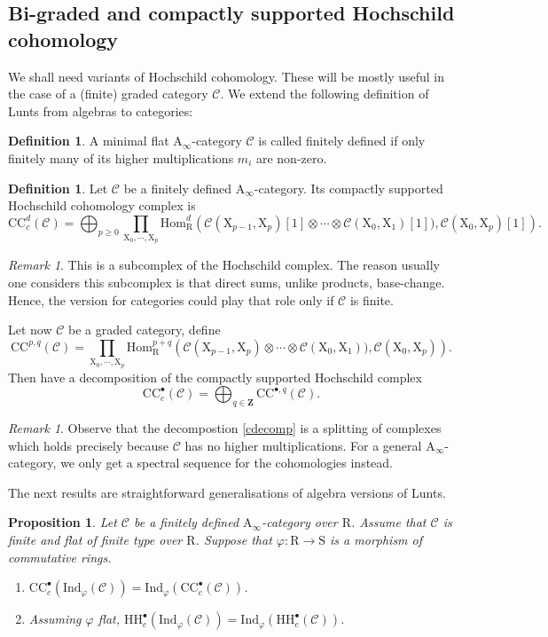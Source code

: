 \documentclass{article}
\theoremstyle{plain}
\newtheorem{proposition}[theorem]{Proposition}
\theoremstyle{definition}
\newtheorem{definition}[theorem]{Definition}
\theoremstyle{remark}
\newtheorem{remark}[theorem]{Remark}
\newcommand{\mr}{\mathrm}
\newcommand{\Aa}{\mr{A}_{\infty}}
\newcommand{\Z}{\mathbf Z}
\newcommand{\Cc}{\mathcal C}
\newcommand{\3}{\vspace{3mm}}
\newcommand{\2}{\vspace{2mm}}
\newcommand{\1}{\vspace{1mm}}
\begin{document}
\subsection{Bi-graded and compactly supported Hochschild cohomology}
We shall need variants of Hochschild cohomology. These will be mostly useful in the case of a (finite) graded category $\Cc$. We extend the following definition of Lunts from algebras to categories:
\begin{definition}
A minimal flat $\Aa$-category $\Cc$ is called finitely defined if only finitely many of its higher multiplications $m_i$ are non-zero.
\end{definition}
\2
\begin{definition}
Let $\Cc$ be a finitely defined $\Aa$-category. Its compactly supported Hochschild cohomology complex is $$\mr{CC}_c^{d}(\Cc)=\bigoplus_{p\ge 0}\prod_{\mr{X}_0,\cdots,\mr{X}_p} \mr{Hom}_\mr{R}^d\left(\Cc(\mr{X}_{p-1},\mr{X}_p)[1]\otimes \cdots\otimes\Cc(\mr{X}_0,\mr{X}_1)[1]),\Cc(\mr{X}_0,\mr{X}_p)[1]\right).$$
\end{definition}
\2
\begin{remark}
This is a subcomplex of the Hochschild complex. The reason usually one considers this subcomplex is that direct sums, unlike products, base-change. Hence, the version for categories could play that role only if $\Cc$ is finite.
\end{remark}
Let now $\Cc$ be a graded category, define $$\mr{CC}^{p,q}(\Cc) = \prod_{\mr{X}_0,\cdots,\mr{X}_p} \mr{Hom}_\mr{R}^{p+q}\left(\Cc(\mr{X}_{p-1},\mr{X}_p)\otimes \cdots\otimes\Cc(\mr{X}_0,\mr{X}_1)),\Cc(\mr{X}_0,\mr{X}_p)\right).$$ Then have a decomposition of the compactly supported Hochschild complex \begin{equation}\label{cdecomp}
\mr{CC}^{\bullet}_c(\Cc)=\bigoplus_{q\in \Z} \mr{CC}^{\bullet,q}(\Cc).\end{equation}
\begin{remark}
Observe that the decompostion \eqref{cdecomp} is a splitting of complexes which holds precisely because $\Cc$ has no higher multiplications. For a general $\Aa$-category, we only get a spectral sequence for the cohomologies instead.
\end{remark}
The next results are straightforward generalisations of algebra versions of Lunts. 
\2
\begin{proposition}\label{hochbasechange}
 Let $\Cc$ be a finitely defined $\Aa$-category over $\mr{R}$. Assume that $\Cc$ is finite and flat of finite type over $\mr{R}$. Suppose that $\varphi:\mr{R} \to \mr{S}$ is a morphism of commutative rings. 
 \begin{enumerate}
  \item $\mr{CC}^{\bullet}_c(\mr{Ind}_\varphi(\Cc)) = \mr{Ind}_\varphi\left(\mr{CC}^{\bullet}_c(\Cc)\right)$.
  \item Assuming $\varphi$ flat, $\mr{HH}_c^{\bullet}(\mr{Ind}_\varphi(\Cc)) = \mr{Ind}_\varphi(\mr{HH}^{\bullet}_c(\Cc))$.
 \end{enumerate}
\end{proposition}
\end{document}
